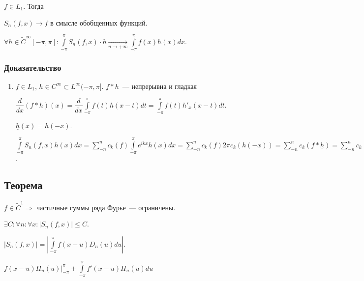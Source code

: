 \documentclass{article}
\begin{document}
        $f \in L_1$. Тогда
        
        $S_n(f, x) \rightarrow f$ в смысле обобщенных функций.
        
        $\forall h \in \widetilde{C}^{\infty} [-\pi, \pi] : \int\limits^{\pi}_{-\pi} S_n(f, x) \cdot h \xrightarrow[n \rightarrow +\infty]{} \int\limits^{\pi}_{-\pi} f(x) h(x) dx$.
        
        \subsubsection{Доказательство}
        
            \begin{enumerate}
            
                \item $f \in L_1$, $h \in C^{\infty} \subset L^{\infty} (-\pi, \pi]$. $f * h$~--- непрерывна и гладкая
                
                    $\dfrac{d}{dx} (f * h) (x) = \dfrac{d}{dx} \int\limits^{\pi}_{-\pi} f(t) h(x - t) dt = \int\limits^{\pi}_{-\pi} f(t) h'_x (x - t) dt$.
                    
                    $\underline{h}(x) = h(-x)$.
                    
                    $\int\limits^{\pi}_{-\pi} S_n(f, x) h(x) dx = \sum\limits^n_{-n} c_k(f) \int\limits^{\pi}_{-\pi} e^{ikx} h(x) dx = \sum\limits^n_{-n} c_k(f) 2 \pi c_k(h(-x)) = \sum\limits^n_{-n} c_k (f * \underline{h}) = \sum\limits^n_{-n} c_k (f * \underline{h}) e^{ikx} \bigg|_{x = 0} \xrightarrow[n \rightarrow +\infty]{} f * \underline{h}(0) = \int\limits^{\pi}_{-\pi} f(t) \underline{h}(-t) dt$.
                
            \end{enumerate}
            
    \subsection{Теорема}
    
        $f \in \widetilde{C}^1 \Rightarrow$ частичные суммы ряда Фурье~--- ограничены.
        
        $\exists C : \forall n : \forall x : \left| S_n(f, x) \right| \leqslant C$.
        
        $|S_n(f, x)| = \left| \int\limits^{\pi}_{-\pi} f(x - u) D_n(u) du \right|$.
        
        $f(x - u) H_n(u) \bigg|^{\pi}_{-\pi} + \int\limits^{\pi}_{-\pi} f'(x - u) H_n(u) du$
        
\end{document}
